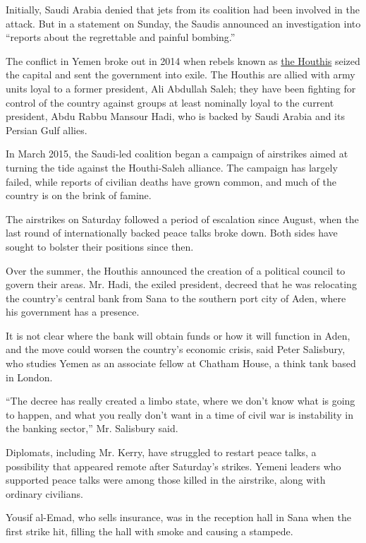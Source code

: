 Initially, Saudi Arabia denied that jets from its coalition had been
involved in the attack. But in a statement on Sunday, the Saudis
announced an investigation into ``reports about the regrettable and
painful bombing.''

The conflict in Yemen broke out in 2014 when rebels known as
\href{http://www.nytimes.com/2015/01/21/world/middleeast/who-are-the-houthis-of-yemen.html}{the
Houthis} seized the capital and sent the government into exile. The
Houthis are allied with army units loyal to a former president, Ali
Abdullah Saleh; they have been fighting for control of the country
against groups at least nominally loyal to the current president, Abdu
Rabbu Mansour Hadi, who is backed by Saudi Arabia and its Persian Gulf
allies.

In March 2015, the Saudi-led coalition began a campaign of airstrikes
aimed at turning the tide against the Houthi-Saleh alliance. The
campaign has largely failed, while reports of civilian deaths have grown
common, and much of the country is on the brink of famine.

The airstrikes on Saturday followed a period of escalation since August,
when the last round of internationally backed peace talks broke down.
Both sides have sought to bolster their positions since then.

Over the summer, the Houthis announced the creation of a political
council to govern their areas. Mr. Hadi, the exiled president, decreed
that he was relocating the country's central bank from Sana to the
southern port city of Aden, where his government has a presence.

It is not clear where the bank will obtain funds or how it will function
in Aden, and the move could worsen the country's economic crisis, said
Peter Salisbury, who studies Yemen as an associate fellow at Chatham
House, a think tank based in London.

``The decree has really created a limbo state, where we don't know what
is going to happen, and what you really don't want in a time of civil
war is instability in the banking sector,'' Mr. Salisbury said.

Diplomats, including Mr. Kerry, have struggled to restart peace talks, a
possibility that appeared remote after Saturday's strikes. Yemeni
leaders who supported peace talks were among those killed in the
airstrike, along with ordinary civilians.

Yousif al-Emad, who sells insurance, was in the reception hall in Sana
when the first strike hit, filling the hall with smoke and causing a
stampede.

